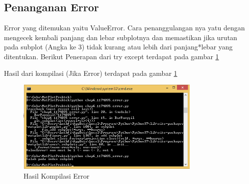 	\subsection{Penanganan Error}
	Error yang ditemukan yaitu ValueError. Cara penanggulangan nya yatu dengan mengecek kembali panjang dan lebar subplotnya dan memastikan jika urutan pada subplot (Angka ke 3) tidak kurang atau lebih dari panjang*lebar yang ditentukan.
	Berikut Penerapan dari try except terdapat pada gambar \ref{1174035_Error}
	
	Hasil dari kompilasi (Jika Error) terdapat pada gambar \ref{1174035_Error} 
	\begin{figure}[ht]
		\centerline{\includegraphics[width=0.8\textwidth]{figures/6/1174035/Praktek/Error.png}}
		\caption{Hasil Kompilasi Error}
		\label{1174035_Error}
	\end{figure}